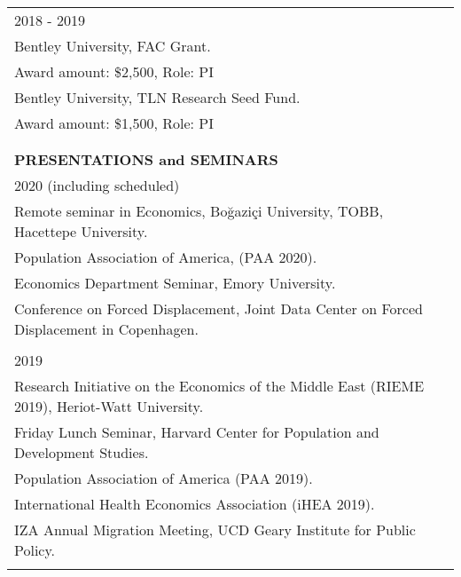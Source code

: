 \documentclass[12 pt]{article}
\begin{document}
\begin{longtable}{ccccc}
 \multicolumn{5}{l}{2018 - 2019} \\
 \multicolumn{5}{l}{Bentley University, FAC Grant.} \\
\multicolumn{5}{l}{Award amount: \$2,500, Role: PI}  \\

 \multicolumn{5}{l}{Bentley University, TLN Research Seed Fund.} \\
\multicolumn{5}{l}{Award amount: \$1,500, Role: PI} \\

\\
\\
\multicolumn{5}{l}{\textbf{PRESENTATIONS and SEMINARS}} \\[2 pt]

\multicolumn{5}{l}{2020 (including scheduled)} \\

\multicolumn{5}{l}{Remote seminar in Economics, Bo\u{g}azi\c{c}i University, TOBB, Hacettepe University.} \\ 
\multicolumn{5}{l}{Population Association of America, (PAA 2020).} \\ 
\multicolumn{5}{l}{Economics Department Seminar, Emory University.} \\ 
\multicolumn{5}{l}{Conference on Forced Displacement, Joint Data Center on Forced Displacement in Copenhagen.}\\
\\
\multicolumn{5}{l}{2019} \\
\multicolumn{5}{l}{Research Initiative on the Economics of the Middle East (RIEME 2019), Heriot-Watt University.} \\
\multicolumn{5}{l}{Friday Lunch Seminar, Harvard Center for Population and Development Studies.} \\
\multicolumn{5}{l}{Population Association of America (PAA 2019).} \\
\multicolumn{5}{l}{International Health Economics Association (iHEA 2019).} \\
\multicolumn{5}{l}{IZA Annual Migration Meeting, UCD Geary Institute for Public Policy.} \\

\\ 


\end{longtable}
\end{document}

